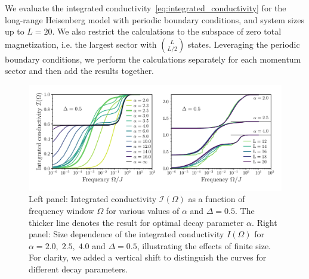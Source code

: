We evaluate the integrated conductivity~\eqref{eq:integrated_conductivity} for the long-range Heisenberg model
with periodic boundary conditions, and system sizes up to \(L=20\). We also restrict the calculations to the
subspace of zero total magnetization, i.e. the largest sector with \(\binom{L}{L/2}\) states. Leveraging
the periodic boundary conditions, we perform the calculations separately for each momentum sector and then
add the results together.

\begin{figure}[htbp]
  \centering
  \includegraphics[width=\linewidth]{Figures/optical_conductivity.pdf}
  \caption{Left panel: Integrated conductivity \(\mathcal{I}(\Omega)\) as a function of frequency window \(\Omega\) for various values of \(\alpha\)
    and \(\Delta = 0.5\). The thicker line denotes the result for optimal decay parameter \(\alpha\). Right panel: Size dependence
    of the integrated conductivity \(I(\Omega)\) for \(\alpha = 2.0, \; 2.5,\; 4.0\) and \(\Delta = 0.5\),
    illustrating the effects of finite size. For clarity, we added a vertical shift to distinguish the curves for different
    decay parameters.}
  \label{fig:optical_conductivity}
\end{figure}

